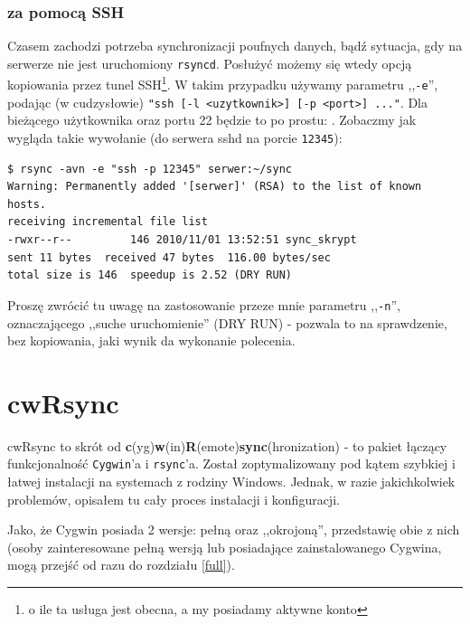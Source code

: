 \subsubsection{za pomocą SSH}
Czasem zachodzi potrzeba synchronizacji poufnych danych, bądź sytuacja, gdy na serwerze nie jest uruchomiony \verb|rsyncd|. Posłużyć możemy się wtedy opcją kopiowania przez tunel SSH\footnote{o ile ta usługa jest obecna, a my posiadamy aktywne konto}. W takim przypadku używamy parametru ,,\verb|-e|'', podając (w cudzysłowie) \verb|"ssh [-l <uzytkownik>] [-p <port>] ..."|. Dla bieżącego użytkownika oraz portu 22 będzie to po prostu: . Zobaczmy jak wygląda takie wywołanie (do serwera sshd na porcie \verb|12345|):
\begin{verbatim}
$ rsync -avn -e "ssh -p 12345" serwer:~/sync 
Warning: Permanently added '[serwer]' (RSA) to the list of known hosts.
receiving incremental file list
-rwxr--r--         146 2010/11/01 13:52:51 sync_skrypt
sent 11 bytes  received 47 bytes  116.00 bytes/sec
total size is 146  speedup is 2.52 (DRY RUN)
\end{verbatim}
Proszę zwrócić tu uwagę na zastosowanie przeze mnie parametru ,,\verb|-n|'', oznaczającego ,,suche uruchomienie'' (DRY RUN) - pozwala to na sprawdzenie, bez kopiowania, jaki wynik da wykonanie polecenia.


\section{cwRsync}
\label{cwrsync}
cwRsync to skrót od {\bf c}(yg){\bf w}(in){\bf R}(emote){\bf sync}(hronization) - to pakiet łączący funkcjonalność \verb|Cygwin|'a \cite{7} i \verb|rsync|'a. Został zoptymalizowany pod kątem szybkiej i łatwej instalacji na systemach z rodziny Windows. Jednak, w razie jakichkolwiek problemów, opisałem tu cały proces instalacji i konfiguracji.

Jako, że Cygwin posiada 2 wersje: pełną oraz ,,okrojoną'', przedstawię obie z nich (osoby zainteresowane pełną wersją lub posiadające zainstalowanego Cygwina, mogą przejść od razu do rozdziału \ref{full}).

